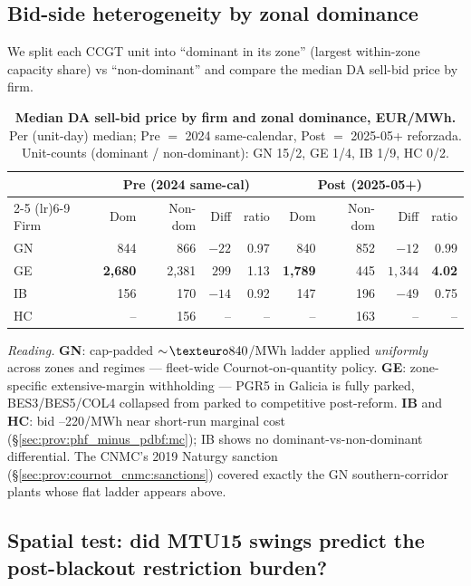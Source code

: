 \documentclass[11pt,a4paper]{article}
\begin{document}
\subsection{Bid-side heterogeneity by zonal dominance}\label{sec:prov:geo:bid_by_dominance}

\noindent We split each CCGT unit into ``dominant in its zone'' (largest within-zone capacity share) vs ``non-dominant'' and compare the median DA sell-bid price by firm.

\begin{table}[H]
\centering
\caption{\textbf{Median DA sell-bid price by firm and zonal dominance, EUR/MWh.} Per (unit-day) median; Pre $=$ 2024 same-calendar, Post $=$ 2025-05+ reforzada. Unit-counts (dominant / non-dominant): GN 15/2, GE 1/4, IB 1/9, HC 0/2.}
\label{tab:bid_by_zonal_dominance}
\setlength{\tabcolsep}{6pt}
\begin{tabular}{l r r r r r r r r}
\toprule
 & \multicolumn{4}{c}{Pre (2024 same-cal)} & \multicolumn{4}{c}{Post (2025-05+)} \\
 \cmidrule(lr){2-5} \cmidrule(lr){6-9}
Firm & Dom & Non-dom & Diff & ratio & Dom & Non-dom & Diff & ratio \\
\midrule
GN & 844 & 866 & $-22$ & 0.97 & 840 & 852 & $-12$ & 0.99 \\
GE & \textbf{2{,}680} & 2{,}381 & $299$ & 1.13 & \textbf{1{,}789} & 445 & \textbf{$1{,}344$} & \textbf{4.02} \\
IB & 156 & 170 & $-14$ & 0.92 & 147 & 196 & $-49$ & 0.75 \\
HC & -- & 156 & -- & -- & -- & 163 & -- & -- \\
\bottomrule
\end{tabular}
\end{table}

\textit{Reading.} \textbf{GN}: cap-padded $\sim\!\texteuro 840$/MWh ladder applied \emph{uniformly} across zones and regimes --- fleet-wide Cournot-on-quantity policy. \textbf{GE}: zone-specific extensive-margin withholding --- PGR5 in Galicia is fully parked, BES3/BES5/COL4 collapsed from parked to competitive post-reform. \textbf{IB} and \textbf{HC}: bid --220/MWh near short-run marginal cost (\S\ref{sec:prov:phf_minus_pdbf:mc}); IB shows no dominant-vs-non-dominant differential. The CNMC's 2019 Naturgy sanction (\S\ref{sec:prov:cournot_cnmc:sanctions}) covered exactly the GN southern-corridor plants whose flat  ladder appears above.

\subsection{Spatial test: did MTU15 swings predict the post-blackout restriction burden?}\label{sec:prov:geo:spatial_blackout}
\end{document}
